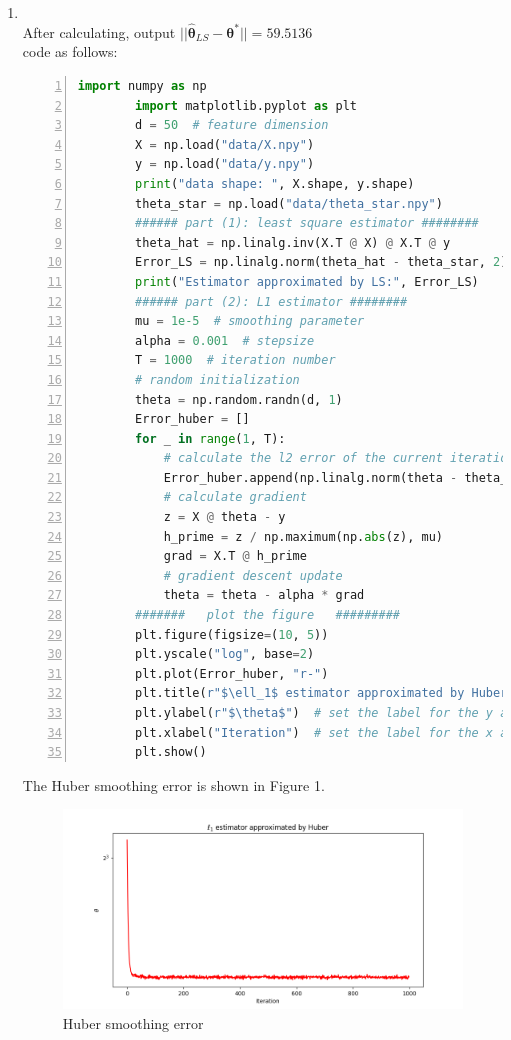 \documentclass[12pt, a4paper, oneside]{article}
\newcounter{problemname}
\newenvironment{problem}{\stepcounter{problemname}\par\noindent{Problem \arabic{problemname}. }}{\par}
\begin{document}
\begin{problem}
\begin{enumerate}[label = (\alph*)]
    \item \quad \\
        After calculating, output $||\bm\hat\theta_{LS} - \bm\theta^*|| = 59.5136$ \\
        code as follows:
        \begin{lstlisting}[language=Python, basicstyle=\small, numbers=left, stepnumber=1, numbersep=5pt, columns=fullflexible, keepspaces=true, lineskip=0.1em]
        import numpy as np
        import matplotlib.pyplot as plt
        d = 50  # feature dimension
        X = np.load("data/X.npy")
        y = np.load("data/y.npy")
        print("data shape: ", X.shape, y.shape)
        theta_star = np.load("data/theta_star.npy")
        ###### part (1): least square estimator ########
        theta_hat = np.linalg.inv(X.T @ X) @ X.T @ y
        Error_LS = np.linalg.norm(theta_hat - theta_star, 2)
        print("Estimator approximated by LS:", Error_LS)
        ###### part (2): L1 estimator ########
        mu = 1e-5  # smoothing parameter
        alpha = 0.001  # stepsize
        T = 1000  # iteration number
        # random initialization
        theta = np.random.randn(d, 1)
        Error_huber = []
        for _ in range(1, T):
            # calculate the l2 error of the current iteration
            Error_huber.append(np.linalg.norm(theta - theta_star, 2))
            # calculate gradient
            z = X @ theta - y
            h_prime = z / np.maximum(np.abs(z), mu)
            grad = X.T @ h_prime
            # gradient descent update
            theta = theta - alpha * grad
        #######   plot the figure   #########
        plt.figure(figsize=(10, 5))
        plt.yscale("log", base=2)
        plt.plot(Error_huber, "r-")
        plt.title(r"$\ell_1$ estimator approximated by Huber")
        plt.ylabel(r"$\theta$")  # set the label for the y axis
        plt.xlabel("Iteration")  # set the label for the x axis
        plt.show()
        \end{lstlisting}
        The Huber smoothing error is shown in Figure 1.
        \begin{figure}[htbp]
            \centering
            \includegraphics[width=1\textwidth]{../code_source/p3/theta_error.png}
            \caption{Huber smoothing error}
        \end{figure}
\end{enumerate}
\end{problem}
\end{document}
